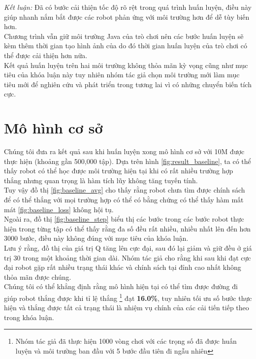 \begin{enumerate}
    \textit{Kết luận:} Đã có bước cải thiện tốc độ rõ rệt trong quá trình huấn luyện, điều này giúp nhanh nắm bắt được các robot phản ứng với môi trường hơn để dễ tùy biến hơn.\\
    Chương trình vẫn giữ môi trường Java của trò chơi nên các bước huấn luyện sẽ kèm thêm thời gian tạo hình ảnh của \cite{stark2012java} do đó thời gian huấn luyện của trò chơi có thể được cải thiện  hơn nữa.\\
    Kết quả huấn luyện trên hai môi trường không thỏa mãn kỳ vọng cũng như mục tiêu của khóa luận này tuy nhiên nhóm tác giả chọn môi trường mới làm mục tiêu mới để nghiên cứu và phát triển trong tương lai vì có những chuyển biến tích cực.\\
\end{enumerate}
\section{Mô hình cơ sở}
Chúng tôi đưa ra kết quả sau khi huấn luyện xong mô hình cơ sở với 10M được thực hiện (khoảng gần 500,000 tập). Dựa trên hình \ref{fig:result_baseline}, ta có thể thấy robot có thể học được môi trường hiện tại khi có rất nhiều trường hợp thắng nhưng quan trọng là hàm tích lũy không tăng tuyến tính.\\
Tuy vậy đồ thị \ref{fig:baseline_avg} cho thấy rằng robot chưa tìm được chính sách để có thể thắng với mọi trường hợp có thể có bằng chứng có thể thấy hàm mất mát \ref{fig:baseline_loss} không hội tụ.\\
\clearpage
Ngoài ra, đồ thị \ref{fig:baseline_step} biểu thị các bước trong các bước robot thực hiện trong từng tập  có thể thấy rằng đa số đều rất nhiều, nhiều nhất lên đến hơn 3000 bước, điều này không đúng với mục tiêu của khóa luận.\\
Lưu ý rằng, đồ thị của giá trị Q tăng lên cực đại, sau đó lại giảm và giữ đều ở giá trị 30 trong một khoảng thời gian dài. Nhóm tác giả cho rằng khi sau khi đạt cực đại robot gặp rất nhiều trạng thái khác và chính sách tại đỉnh cao nhất không thỏa mãn được chúng.\\
Chúng tôi có thể khẳng định rằng mô hình hiện tại có thể tìm được đường đi giúp robot thắng được khi tỉ lệ thắng \footnote{Nhóm tác giả đã thực hiện 1000 vòng chơi với các trọng số đã được huấn luyện và môi trường ban đầu với 5 bước đầu tiên đi ngẫu nhiên} đạt \textbf{16.0\%}, tuy nhiên tối ưu số bước thực hiện và thắng được tất cả trạng thái là nhiệm vụ chính của các cải tiến tiếp theo trong khóa luận.
